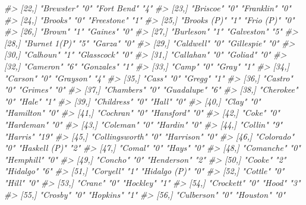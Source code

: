 \documentclass[
  12pt,
  openany]{book}
\newenvironment{Shaded}{\begin{snugshade}}{\end{snugshade}}
\newcommand{\CommentTok}[1]{\textcolor[rgb]{0.37,0.37,0.37}{\textit{#1}}}
\begin{document}
\begin{Shaded}
\begin{Highlighting}[]
\CommentTok{\#\textgreater{} [22,] "Brewster"      "0"  "Fort Bend"   "4" }
\CommentTok{\#\textgreater{} [23,] "Briscoe"       "0"  "Franklin"    "0" }
\CommentTok{\#\textgreater{} [24,] "Brooks"        "0"  "Freestone"   "1" }
\CommentTok{\#\textgreater{} [25,] "Brooks (P)"    "1"  "Frio (P)"    "0" }
\CommentTok{\#\textgreater{} [26,] "Brown"         "1"  "Gaines"      "0" }
\CommentTok{\#\textgreater{} [27,] "Burleson"      "1"  "Galveston"   "5" }
\CommentTok{\#\textgreater{} [28,] "Burnet 1(P)"   "5"  "Garza"       "0" }
\CommentTok{\#\textgreater{} [29,] "Caldwell"      "0"  "Gillespie"   "0" }
\CommentTok{\#\textgreater{} [30,] "Calhoun"       "1"  "Glasscock"   "0" }
\CommentTok{\#\textgreater{} [31,] "Callahan"      "0"  "Goliad"      "0" }
\CommentTok{\#\textgreater{} [32,] "Cameron"       "6"  "Gonzales"    "1" }
\CommentTok{\#\textgreater{} [33,] "Camp"          "0"  "Gray"        "1" }
\CommentTok{\#\textgreater{} [34,] "Carson"        "0"  "Grayson"     "4" }
\CommentTok{\#\textgreater{} [35,] "Cass"          "0"  "Gregg"       "1" }
\CommentTok{\#\textgreater{} [36,] "Castro"        "0"  "Grimes"      "0" }
\CommentTok{\#\textgreater{} [37,] "Chambers"      "0"  "Guadalupe"   "6" }
\CommentTok{\#\textgreater{} [38,] "Cherokee"      "0"  "Hale"        "1" }
\CommentTok{\#\textgreater{} [39,] "Childress"     "0"  "Hall"        "0" }
\CommentTok{\#\textgreater{} [40,] "Clay"          "0"  "Hamilton"    "0" }
\CommentTok{\#\textgreater{} [41,] "Cochran"       "0"  "Hansford"    "0" }
\CommentTok{\#\textgreater{} [42,] "Coke"          "0"  "Hardeman"    "0" }
\CommentTok{\#\textgreater{} [43,] "Coleman"       "0"  "Hardin"      "0" }
\CommentTok{\#\textgreater{} [44,] "Collin"        "9"  "Harris"      "19"}
\CommentTok{\#\textgreater{} [45,] "Collingsworth" "0"  "Harrison"    "0" }
\CommentTok{\#\textgreater{} [46,] "Colorado"      "0"  "Haskell (P)" "2" }
\CommentTok{\#\textgreater{} [47,] "Comal"         "0"  "Hays"        "0" }
\CommentTok{\#\textgreater{} [48,] "Comanche"      "0"  "Hemphill"    "0" }
\CommentTok{\#\textgreater{} [49,] "Concho"        "0"  "Henderson"   "2" }
\CommentTok{\#\textgreater{} [50,] "Cooke"         "2"  "Hidalgo"     "6" }
\CommentTok{\#\textgreater{} [51,] "Coryell"       "1"  "Hidalgo (P)" "0" }
\CommentTok{\#\textgreater{} [52,] "Cottle"        "0"  "Hill"        "0" }
\CommentTok{\#\textgreater{} [53,] "Crane"         "0"  "Hockley"     "1" }
\CommentTok{\#\textgreater{} [54,] "Crockett"      "0"  "Hood"        "3" }
\CommentTok{\#\textgreater{} [55,] "Crosby"        "0"  "Hopkins"     "1" }
\CommentTok{\#\textgreater{} [56,] "Culberson"     "0"  "Houston"     "0" }

\end{Highlighting}
\end{Shaded}
\end{document}
